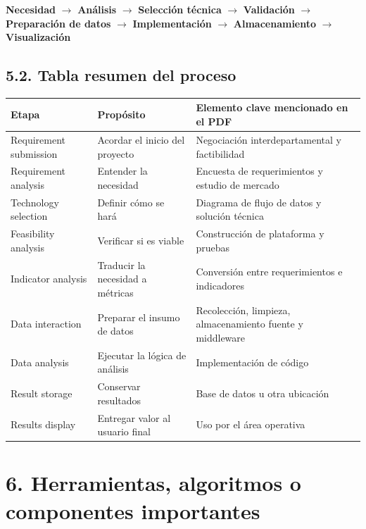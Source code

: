 \documentclass[8pt,a4paper,twocolumn]{article}
\begin{document}
\begin{center}
\textbf{Necesidad} $\rightarrow$ \textbf{Análisis} $\rightarrow$ \textbf{Selección técnica} $\rightarrow$ \textbf{Validación} $\rightarrow$ \textbf{Preparación de datos} $\rightarrow$ \textbf{Implementación} $\rightarrow$ \textbf{Almacenamiento} $\rightarrow$ \textbf{Visualización}
\end{center}

\subsection*{5.2. Tabla resumen del proceso}

\begin{table}[t]
\small
\centering
\begin{tabularx}{\textwidth}{>{\raggedright\arraybackslash}p{} >{\raggedright\arraybackslash}p{} >{\raggedright\arraybackslash}X}
\toprule
\textbf{Etapa} & \textbf{Propósito} & \textbf{Elemento clave mencionado en el PDF} \\
\midrule
Requirement submission & Acordar el inicio del proyecto & Negociación interdepartamental y factibilidad \\
Requirement analysis & Entender la necesidad & Encuesta de requerimientos y estudio de mercado \\
Technology selection & Definir cómo se hará & Diagrama de flujo de datos y solución técnica \\
Feasibility analysis & Verificar si es viable & Construcción de plataforma y pruebas \\
Indicator analysis & Traducir la necesidad a métricas & Conversión entre requerimientos e indicadores \\
Data interaction & Preparar el insumo de datos & Recolección, limpieza, almacenamiento fuente y middleware \\
Data analysis & Ejecutar la lógica de análisis & Implementación de código \\
Result storage & Conservar resultados & Base de datos u otra ubicación \\
Results display & Entregar valor al usuario final & Uso por el área operativa \\
\bottomrule
\end{tabularx}
\end{table}

\section*{6. Herramientas, algoritmos o componentes importantes}
\end{document}
